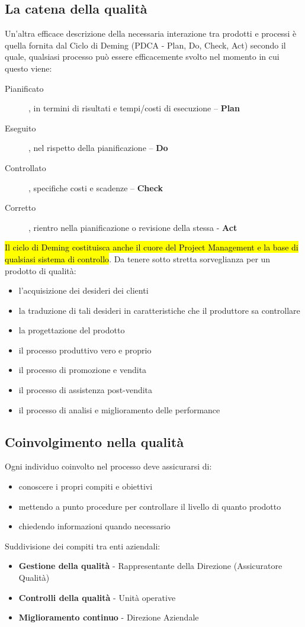 \documentclass[a4paper]{article}
\begin{document}
\subsection{La catena della qualità}
Un'altra efficace descrizione della necessaria interazione tra prodotti e processi è quella fornita dal Ciclo di
Deming (PDCA - Plan, Do, Check, Act) secondo il quale, qualsiasi processo può essere efficacemente svolto
nel momento in cui questo viene:
\begin{description}
    \item[Pianificato], in termini di risultati e tempi/costi di esecuzione – \textbf{Plan}
    \item[Eseguito], nel rispetto della pianificazione – \textbf{Do}
    \item[Controllato], specifiche costi e scadenze – \textbf{Check}
    \item[Corretto], rientro nella pianificazione o revisione della stessa - \textbf{Act}
\end{description}
\hl{Il ciclo di Deming costituisca anche il cuore del Project Management e la base di qualsiasi
sistema di controllo}. \newline
Da tenere sotto stretta sorveglianza per un prodotto di qualità:
\begin{itemize}
    \item l'acquisizione dei desideri dei clienti
    \item la traduzione di tali desideri in caratteristiche che il produttore sa controllare
    \item la progettazione del prodotto
    \item il processo produttivo vero e proprio
    \item il processo di promozione e vendita
    \item il processo di assistenza post-vendita 
    \item il processo di analisi e miglioramento delle performance 
\end{itemize}
\subsection{Coinvolgimento nella qualità}
Ogni individuo coinvolto nel processo deve assicurarsi di:
\begin{itemize}
    \item conoscere i propri compiti e obiettivi
    \item mettendo a punto procedure per controllare il livello di quanto prodotto
    \item chiedendo informazioni quando necessario 
\end{itemize}
Suddivisione dei compiti tra enti aziendali:
\begin{itemize}
    \item \textbf{Gestione della qualità} - Rappresentante della Direzione (Assicuratore Qualità)
    \item \textbf{Controlli della qualità} - Unità operative
    \item \textbf{Miglioramento continuo} - Direzione Aziendale
\end{itemize}
\end{document}
